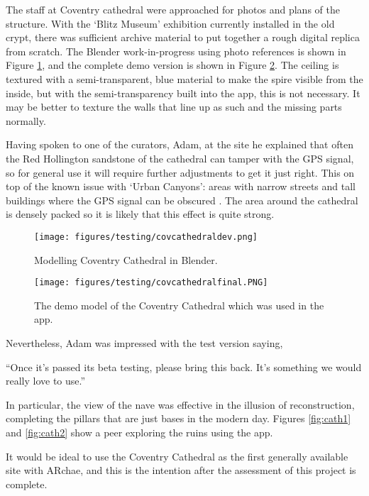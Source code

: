 \documentclass[12pt, a4paper]{article}
\begin{document}
The staff at Coventry cathedral were approached for photos and plans of the structure. With the `Blitz Museum' exhibition currently installed in the old crypt, there was sufficient archive material to put together a rough digital replica from scratch. The Blender work-in-progress using photo references is shown in Figure \ref{fig:covdev}, and the complete demo version is shown in Figure \ref{fig:covfinal}. The ceiling is textured with a semi-transparent, blue material to make the spire visible from the inside, but with the semi-transparency built into the app, this is not necessary. It may be better to texture the walls that line up as such and the missing parts normally. 

Having spoken to one of the curators, Adam, at the site he explained that often the Red Hollington sandstone of the cathedral can tamper with the GPS signal, so for general use it will require further adjustments to get it just right. This on top of the known issue with `Urban Canyons': areas with narrow streets and tall buildings where the GPS signal can be obscured \cite{testing:urbancanyon}. The area around the cathedral is densely packed so it is likely that this effect is quite strong.

\begin{figure}[h]
\centering
    \texttt{[image: figures/testing/covcathedraldev.png]}
        \caption{Modelling Coventry Cathedral in Blender.}
        \label{fig:covdev}
\end{figure}

\begin{figure}[H]
\centering
    \texttt{[image: figures/testing/covcathedralfinal.PNG]}
        \caption{The demo model of the Coventry Cathedral  which was used in the app.}
        \label{fig:covfinal}
\end{figure}

Nevertheless, Adam was impressed with the test version saying, 

``Once it’s passed its beta testing, please bring this back. It’s something we would really love to use.'' 

In particular, the view of the nave was effective in the illusion of reconstruction, completing the pillars that are just bases in the modern day. Figures \ref{fig:cath1} and \ref{fig:cath2} show a peer exploring the ruins using the app.

It would be ideal to use the Coventry Cathedral as the first generally available site with ARchae, and this is the intention after the assessment of this project is complete.
\end{document}
